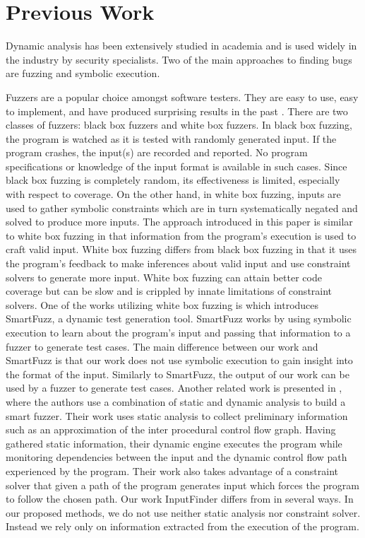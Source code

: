 \documentclass{acm_proc_article-sp}
\def \tool {InputFinder}
\begin{document}
\section{Previous Work} \label{prevwork}

Dynamic analysis has been extensively studied in academia and is used widely in the industry by security specialists.
Two of the main approaches to finding bugs are fuzzing and symbolic execution.

Fuzzers are a popular choice amongst software testers.
They are easy to use, easy to implement, and have produced surprising results in the past \cite{millerfuzz, millerfuzzrevisited}.
There are two classes of fuzzers: black box fuzzers and white box fuzzers.
In black box fuzzing, the program is watched as it is tested with randomly generated input.
If the program crashes, the input(s) are recorded and reported.
No program specifications or knowledge of the input format is available in such cases.
Since black box fuzzing is completely random, its effectiveness is limited, especially with respect to coverage.
On the other hand, in white box fuzzing, inputs are used to gather symbolic constraints which are in turn systematically negated and solved to produce more inputs.
The approach introduced in this paper is similar to white box fuzzing in that information from the program's execution is used to craft valid input.
White box fuzzing differs from black box fuzzing in that it uses the program's feedback to make inferences about valid input and use constraint solvers to generate more input.
White box fuzzing can attain better code coverage but can be slow and is crippled by innate limitations of constraint solvers.
One of the works utilizing white box fuzzing is \cite{molnar2009dynamic} which introduces SmartFuzz, a dynamic test generation tool.
SmartFuzz works by using symbolic execution to learn about the program's input and passing that information to a fuzzer to generate test cases.
The main difference between our work and SmartFuzz is that our work does not use symbolic execution to gain insight into the format of the input.
Similarly to SmartFuzz, the output of our work can be used by a fuzzer to generate test cases.
Another related work is presented in \cite{smartfuzzer}, where the authors use a combination of static and dynamic analysis to build a smart fuzzer.
Their work uses static analysis to collect preliminary information such as an approximation of the inter procedural control flow graph.
Having gathered static information, their dynamic engine executes the program while monitoring dependencies between the input and the dynamic control flow path experienced by the program.
Their work also takes advantage of a constraint solver that given a path of the program generates input which forces the program to follow the chosen path.
Our work \tool{} differs from \cite{smartfuzzer} in several ways.
In our proposed methods, we do not use neither static analysis nor constraint solver.
Instead we rely only on information extracted from the execution of the program. 
\end{document}

